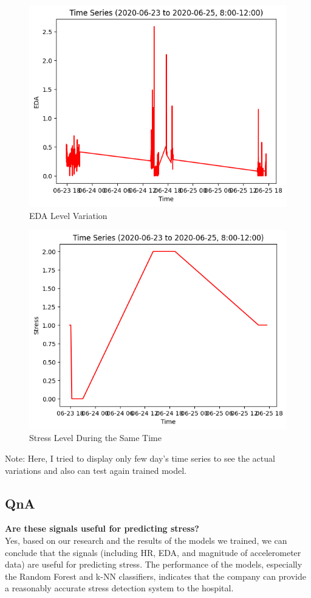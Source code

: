 \documentclass{article}
\begin{document}
\begin{figure}
    \centering
    \includegraphics{EDA.png}
    \caption{EDA Level Variation}
    \label{fig:my_label}
\end{figure}

\begin{figure}
    \centering
    \includegraphics{StressLevel.png}
    \caption{Stress Level During the Same Time}
    \label{fig:my_label}
\end{figure}
Note: Here, I tried to display only few day's time series to see the actual variations and also can test again trained model.

\subsection{QnA}
\textbf{Are these signals useful for predicting stress?}
\\ Yes, based on our research and the results of the models we trained, we can conclude that the signals (including HR, EDA, and magnitude of accelerometer data) are useful for predicting stress. The performance of the models, especially the Random Forest and k-NN classifiers, indicates that the company can provide a reasonably accurate stress detection system to the hospital.
\end{document}
